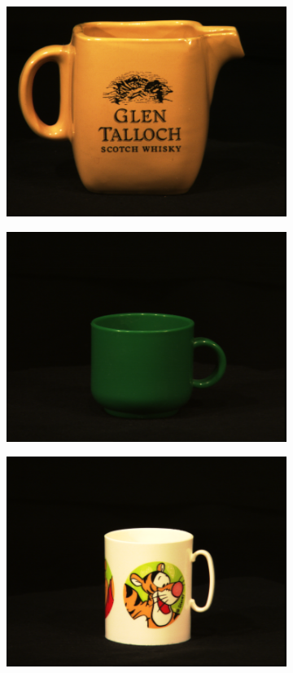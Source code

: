 \begin{figure}[tbp]
\begin{subfigure}{80pt}
    \includegraphics[width=\textwidth]{figures/aloi_original/127.png}
    \caption{}
	\end{subfigure}
	\begin{subfigure}{80pt}
        \centering
    \includegraphics[width=\textwidth]{figures/aloi_original/153.png}
    \caption{}
	\end{subfigure}
	\begin{subfigure}{80pt}
        \centering
    \includegraphics[width=\textwidth]{figures/aloi_original/157.png}

\end{subfigure}
\end{figure}
